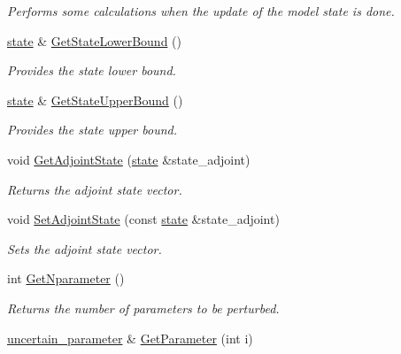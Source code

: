 \documentclass{tufte-book}
\begin{document}
\begin{DoxyCompactItemize}
\begin{DoxyCompactList}\small\item\em \-Performs some calculations when the update of the model state is done. \end{DoxyCompactList}\item
\hyperlink{class_verdandi_1_1_model_template_a6bb9efb7898f067bb21780159b497ba7}{state} \& \hyperlink{class_verdandi_1_1_model_template_a2d8a56a887c98f929ad2a097fcf57fd5}{\-Get\-State\-Lower\-Bound} ()
\begin{DoxyCompactList}\small\item\em \-Provides the state lower bound. \end{DoxyCompactList}\item
\hyperlink{class_verdandi_1_1_model_template_a6bb9efb7898f067bb21780159b497ba7}{state} \& \hyperlink{class_verdandi_1_1_model_template_acfb65c09590c706eba2c9c5280b4c322}{\-Get\-State\-Upper\-Bound} ()
\begin{DoxyCompactList}\small\item\em \-Provides the state upper bound. \end{DoxyCompactList}\item
void \hyperlink{class_verdandi_1_1_model_template_a8e8945fad8e7749fcdc0cc58880b0226}{\-Get\-Adjoint\-State} (\hyperlink{class_verdandi_1_1_model_template_a6bb9efb7898f067bb21780159b497ba7}{state} \&state\-\_\-adjoint)
\begin{DoxyCompactList}\small\item\em \-Returns the adjoint state vector. \end{DoxyCompactList}\item
void \hyperlink{class_verdandi_1_1_model_template_aebaaeb3454b04d913b30376904313675}{\-Set\-Adjoint\-State} (const \hyperlink{class_verdandi_1_1_model_template_a6bb9efb7898f067bb21780159b497ba7}{state} \&state\-\_\-adjoint)
\begin{DoxyCompactList}\small\item\em \-Sets the adjoint state vector. \end{DoxyCompactList}\item
int \hyperlink{class_verdandi_1_1_model_template_a9f148c07e411497f256c6e02c83156ba}{\-Get\-Nparameter} ()
\begin{DoxyCompactList}\small\item\em \-Returns the number of parameters to be perturbed. \end{DoxyCompactList}\item
\hyperlink{class_verdandi_1_1_model_template_ac387d42c1587d4a9c9b15682de1a5741}{uncertain\-\_\-parameter} \& \hyperlink{class_verdandi_1_1_model_template_a1d9ac6be99fd06a40f68927b410454f3}{\-Get\-Parameter} (int i)

\end{DoxyCompactItemize}
\end{document}
